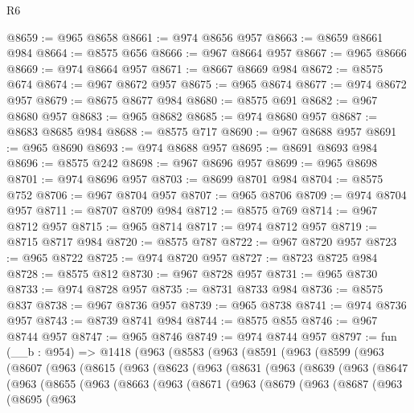 \begin{lexlean}{R6}
\begin{coremodule}
@8659 := @965 @8658
@8661 := @974 @8656 @957
@8663 := @8659 @8661 @984
@8664 := @8575 @656
@8666 := @967 @8664 @957
@8667 := @965 @8666
@8669 := @974 @8664 @957
@8671 := @8667 @8669 @984
@8672 := @8575 @674
@8674 := @967 @8672 @957
@8675 := @965 @8674
@8677 := @974 @8672 @957
@8679 := @8675 @8677 @984
@8680 := @8575 @691
@8682 := @967 @8680 @957
@8683 := @965 @8682
@8685 := @974 @8680 @957
@8687 := @8683 @8685 @984
@8688 := @8575 @717
@8690 := @967 @8688 @957
@8691 := @965 @8690
@8693 := @974 @8688 @957
@8695 := @8691 @8693 @984
@8696 := @8575 @242
@8698 := @967 @8696 @957
@8699 := @965 @8698
@8701 := @974 @8696 @957
@8703 := @8699 @8701 @984
@8704 := @8575 @752
@8706 := @967 @8704 @957
@8707 := @965 @8706
@8709 := @974 @8704 @957
@8711 := @8707 @8709 @984
@8712 := @8575 @769
@8714 := @967 @8712 @957
@8715 := @965 @8714
@8717 := @974 @8712 @957
@8719 := @8715 @8717 @984
@8720 := @8575 @787
@8722 := @967 @8720 @957
@8723 := @965 @8722
@8725 := @974 @8720 @957
@8727 := @8723 @8725 @984
@8728 := @8575 @812
@8730 := @967 @8728 @957
@8731 := @965 @8730
@8733 := @974 @8728 @957
@8735 := @8731 @8733 @984
@8736 := @8575 @837
@8738 := @967 @8736 @957
@8739 := @965 @8738
@8741 := @974 @8736 @957
@8743 := @8739 @8741 @984
@8744 := @8575 @855
@8746 := @967 @8744 @957
@8747 := @965 @8746
@8749 := @974 @8744 @957
@8797 := fun (__b : @954) =>
  @1418
    (@963
      (@8583
        (@963
          (@8591
            (@963
              (@8599
                (@963
                  (@8607
                    (@963
                      (@8615
                        (@963
                          (@8623
                            (@963
                              (@8631
                                (@963
                                  (@8639
                                    (@963
                                      (@8647
                                        (@963
                                          (@8655
                                            (@963
                                              (@8663
                                                (@963
                                                  (@8671
                                                    (@963
                                                      (@8679
                                                        (@963
                                                          (@8687
                                                            (@963
                                                              (@8695
                                                                (@963

\end{coremodule}
\end{lexlean}
